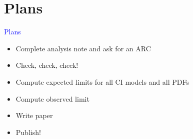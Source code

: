 \documentclass[t,professionalfonts,handout, xcolor=pdftex,dvipsnames,table]{beamer}
\begin{document}

\section{Plans}
\begin{frame}
\textcolor{blue}{Plans}
\begin{itemize}
\item Complete analysis note and ask for an ARC
\item Check, check, check!
\item Compute expected limits for all CI models and all PDFs
\item Compute observed limit
\item Write paper
\item Publish!
\end{itemize}
\end{frame}
\end{document}
